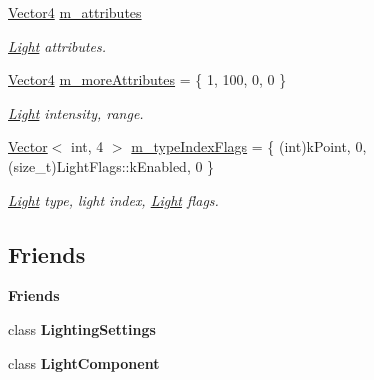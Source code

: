 \begin{Indent}
\begin{DoxyCompactItemize}
\item 
\mbox{\hyperlink{classrev_1_1_vector}{Vector4}} \mbox{\hyperlink{classrev_1_1_light_acb7615661d2b2d0bc67edb759c30cf59}{m\+\_\+attributes}}
\begin{DoxyCompactList}\small\item\em \mbox{\hyperlink{classrev_1_1_light}{Light}} attributes. \end{DoxyCompactList}\item 
\mbox{\label{classrev_1_1_light_a749613bbc104fdfe8834b1c8c9f2f096}} 
\mbox{\hyperlink{classrev_1_1_vector}{Vector4}} \mbox{\hyperlink{classrev_1_1_light_a749613bbc104fdfe8834b1c8c9f2f096}{m\+\_\+more\+Attributes}} = \{ 1, 100, 0, 0 \}
\begin{DoxyCompactList}\small\item\em \mbox{\hyperlink{classrev_1_1_light}{Light}} intensity, range. \end{DoxyCompactList}\item 
\mbox{\label{classrev_1_1_light_a7ff53f54189672c9f50064c5b0323eb9}} 
\mbox{\hyperlink{classrev_1_1_vector}{Vector}}$<$ int, 4 $>$ \mbox{\hyperlink{classrev_1_1_light_a7ff53f54189672c9f50064c5b0323eb9}{m\+\_\+type\+Index\+Flags}} = \{ (int)k\+Point, 0, (size\+\_\+t)Light\+Flags\+::k\+Enabled, 0 \}
\begin{DoxyCompactList}\small\item\em \mbox{\hyperlink{classrev_1_1_light}{Light}} type, light index, \mbox{\hyperlink{classrev_1_1_light}{Light}} flags. \end{DoxyCompactList}\end{DoxyCompactItemize}
\end{Indent}
\subsection*{Friends}
\begin{Indent}\textbf{ Friends}\par
\begin{DoxyCompactItemize}
\item 
\mbox{\label{classrev_1_1_light_a669551dc6cbb5993a3f23e9b0d2a9407}} 
class {\bfseries Lighting\+Settings}
\item 
\mbox{\label{classrev_1_1_light_a2e7fdda96fb4e8a740d14d78a6808157}} 
class {\bfseries Light\+Component}
\end{DoxyCompactItemize}
\end{Indent}


